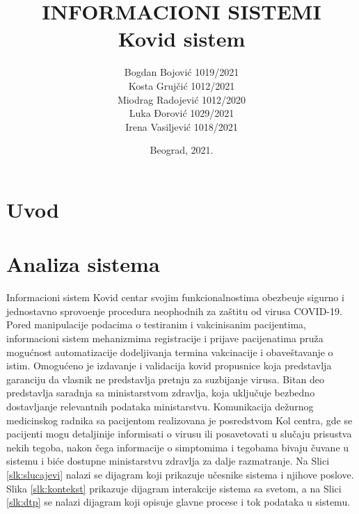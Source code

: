 \documentclass[titlepage]{article}
\title{INFORMACIONI SISTEMI\\Kovid sistem}
\author{
Bogdan Bojović 1019/2021\\
Kosta Grujčić 1012/2021\\
Miodrag Radojević 1012/2020\\
Luka Đorović 1029/2021\\
Irena Vasiljević 1018/2021
}
\date{Beograd, 2021.}
\begin{document}
\maketitle
\tableofcontents

\newpage

\section{Uvod}

\section{Analiza sistema}
Informacioni sistem Kovid centar svojim funkcionalnostima obezbe\dj{}uje sigurno i jednostavno sprovo\dj{}enje procedura neophodnih za za\v{s}titu od virusa COVID-19. \newline
\noindent Pored manipulacije podacima o testiranim i vakcinisanim pacijentima, informacioni sistem mehanizmima registracije i prijave pacijenatima pru\v{z}a mogu\'{c}nost automatizacije dodeljivanja termina vakcinacije i obave\v{s}tavanje o istim. Omogu\'{c}eno je  izdavanje i validacija kovid propusnice koja predstavlja garanciju da vlasnik ne predstavlja pretnju za suzbijanje virusa. Bitan deo predstavlja saradnja sa ministarstvom zdravlja, koja uklju\v{c}uje bezbedno dostavljanje relevantnih podataka ministarstvu. Komunikacija de\v{z}urnog medicinskog radnika sa pacijentom realizovana je posredstvom Kol centra, gde se pacijenti mogu detaljinije informisati o virusu ili  posavetovati u slu\v{c}aju prisustva nekih tegoba, nakon čega informacije o simptomima i tegobama bivaju čuvane u sistemu i biće dostupne ministarstvu zdravlja za dalje razmatranje.\newline
\indent Na Slici \ref{slk:slucajevi} nalazi se dijagram koji prikazuje učesnike sistema i njihove poslove. Slika \ref{slk:kontekst} prikazuje dijagram interakcije sistema sa svetom, a na Slici \ref{slk:dtp} se nalazi dijagram koji opisuje glavne procese i tok podataka u sistemu.
\end{document}
